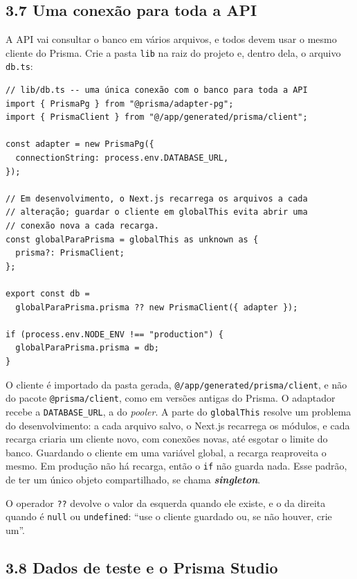 \subsection{3.7 Uma conexão para toda a API}

A API vai consultar o banco em vários arquivos, e todos devem usar o mesmo cliente do Prisma. Crie a pasta \texttt{lib} na raiz do projeto e, dentro dela, o arquivo \texttt{db.ts}:

\begin{codigo}
\begin{Verbatim}[breaklines=true, breaksymbolleft={}, fontsize=\footnotesize]
// lib/db.ts -- uma única conexão com o banco para toda a API
import { PrismaPg } from "@prisma/adapter-pg";
import { PrismaClient } from "@/app/generated/prisma/client";

const adapter = new PrismaPg({
  connectionString: process.env.DATABASE_URL,
});

// Em desenvolvimento, o Next.js recarrega os arquivos a cada
// alteração; guardar o cliente em globalThis evita abrir uma
// conexão nova a cada recarga.
const globalParaPrisma = globalThis as unknown as {
  prisma?: PrismaClient;
};

export const db =
  globalParaPrisma.prisma ?? new PrismaClient({ adapter });

if (process.env.NODE_ENV !== "production") {
  globalParaPrisma.prisma = db;
}
\end{Verbatim}
\end{codigo}

O cliente é importado da pasta gerada, \texttt{@/app/generated/prisma/client}, e não do pacote \texttt{@prisma/client}, como em versões antigas do Prisma. O adaptador recebe a \texttt{DATABASE\_URL}, a do \textit{pooler}. A parte do \texttt{globalThis} resolve um problema do desenvolvimento: a cada arquivo salvo, o Next.js recarrega os módulos, e cada recarga criaria um cliente novo, com conexões novas, até esgotar o limite do banco. Guardando o cliente em uma variável global, a recarga reaproveita o mesmo. Em produção não há recarga, então o \texttt{if} não guarda nada. Esse padrão, de ter um único objeto compartilhado, se chama \textbf{\textit{singleton}}.

O operador \texttt{??} devolve o valor da esquerda quando ele existe, e o da direita quando é \texttt{null} ou \texttt{undefined}: ``use o cliente guardado ou, se não houver, crie um''.

\subsection{3.8 Dados de teste e o Prisma Studio}

